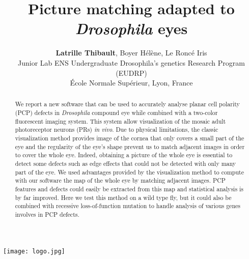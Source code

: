 \documentclass{article}
\author{\textbf{Latrille Thibault}, Boyer Hélène, Le Roncé Iris\\
\small Junior Lab ENS Undergraduate Drosophila's genetics Research Program (EUDRP)\\[-0.8ex]
\small \'Ecole Normale Supérieur, Lyon, France\\}
\title{Picture matching adapted to \textit{Drosophila} eyes }
\begin{document}
\maketitle

\begin{center}
\texttt{[image: logo.jpg]} 
\end{center}
\vfill
\begin{abstract}
We report a new software that can be used to accurately analyse planar cell polarity (PCP) defects in \textit{Drosophila} compound eye while combined with a two-color fluorescent imaging system. This system allow visualization of the mosaic adult photoreceptor neurons
(PRs) \textit{in vivo}. Due to physical limitations, the classic visualization method provides image of the cornea that only covers a small part of the eye and the regularity of the eye's shape prevent us to match adjacent images in order to cover the whole eye. Indeed, obtaining a picture of the whole eye is essential to detect some defects such as edge effects that could not be detected with only many part of the eye. We used advantages provided by the visualization method to compute with our software the map of the whole eye by matching adjacent images. PCP features and defects could easily be extracted from this map and statistical analysis is by far improved. Here we test this method on a wild type fly, but it could also be combined with recessive loss-of-function mutation to handle analysis of various genes involves in PCP defects.
\end{abstract}
\newpage
\end{document}
